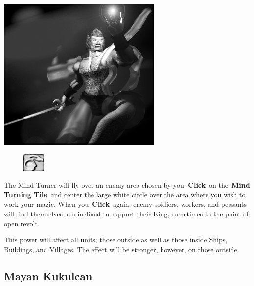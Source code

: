 \begin{center}
	\includegraphics[width=1\linewidth]{Amindturner}
\end{center}

\begin{figure}
	\vspace{-20pt}
	\begin{center}
		\includegraphics[width=0.1\textwidth]{Tmindturn}
	\end{center}
	\vspace{-20pt}
\end{figure}

The Mind Turner will fly over an enemy area chosen by you. \textbf{Click} on the \textbf{Mind Turning Tile} and center the large white circle over the area where you wish to work your magic. When you \textbf{Click} again, enemy soldiers, workers, and peasants will find themselves less inclined to support their King, sometimes to the point of open revolt.

This power will affect all units; those outside as well as those inside Ships, Buildings, and Villages. The effect will be stronger, however, on those outside.

\subsection{Mayan Kukulcan}

